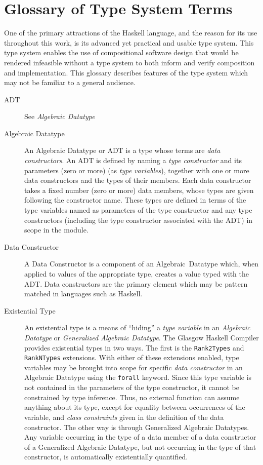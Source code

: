 \chapter{Glossary of Type System Terms}
\label{chapter:Glossary_of_Type_System_Terms}

One of the primary attractions of the Haskell language, and the reason for its
use throughout this work, is its advanced yet practical and usable type system.
This type system enables the use of compositional software design that would
be rendered infeasible without a type system to both inform and verify
composition and implementation. This glossary describes features of the type
system which may not be familiar to a general audience.

\begin{description}
\item[ADT] See {\em Algebraic Datatype}

\item[Algebraic Datatype] An Algebraic Datatype or ADT is a type whose terms
are {\em data constructors}. An ADT is defined by naming a
{\em type constructor} and its parameters (zero or more)
(as {\em type variables}), together with one or more data constructors and the
types of their members. Each data constructor takes a fixed number
(zero or more) data members, whose types are given following the constructor
name. These types are defined in terms of the type variables named as parameters
of the type constructor and any type constructors (including the type
constructor associated with the ADT) in scope in the module.

\item[Data Constructor] A Data Constructor is a component of an
Algebraic~Datatype which, when applied to values of the appropriate type, 
creates a value typed with the ADT. Data constructors are the primary element
which may be pattern matched in languages such as Haskell.

\item[Existential Type] An existential type is a means of ``hiding'' a
{\em type variable} in an {\em Algebraic Datatype} or
{\em Generalized Algebraic Datatype}. The Glasgow Haskell Compiler provides
existential types in two ways. The first is the {\tt Rank2Types} and
{\tt RankNTypes} extensions. With either of these extensions enabled,
type variables may be brought into scope for specific {\em data constructor} in
an Algebraic Datatype using the {\tt forall} keyword. Since this
type variable is not contained in the parameters of the type constructor, it
cannot be constrained by type inference. Thus, no external function can assume
anything about its type, except for equality between occurrences of the
variable, and {\em class constraints} given in the definition of the data
constructor. The other way is through Generalized Algebraic Datatypes. Any
variable occurring in the type of a data member of a data constructor of a
Generalized Algebraic Datatype, but not occurring in the type of that
constructor, is automatically existentially quantified.


\end{description}
